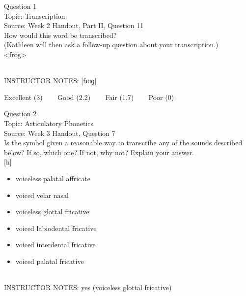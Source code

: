 \documentclass[12pt]{article}
\begin{document}
\begin{center}
\textbf{{\color{blue}{\HUGE START OF EXAM\\}}}

\textbf{{\color{blue}{\HUGE Student ID: 71052\\}}}

\textbf{{\color{blue}{\HUGE \\}}}

\end{center}
\newpage

{\large Question 1}\\

Topic: Transcription\\
Source: Week 2 Handout, Part II, Question 11\\

How would this word be transcribed?\\ (Kathleen will then ask a follow-up question about your transcription.)\\

<frog>


~\\
INSTRUCTOR NOTES: [fɹɑɡ]


\vfill
Excellent (3) ~~~ Good (2.2) ~~~ Fair (1.7) ~~~ Poor (0)
\newpage

{\large Question 2}\\

Topic: Articulatory Phonetics\\
Source: Week 3 Handout, Question 7\\

Is the symbol given a reasonable way to transcribe any of the sounds described below? If so, which one? If not, why not? Explain your answer.\\

{[h]}

\begin{itemize} \item voiceless palatal affricate \item voiced velar nasal \item voiceless glottal fricative \item voiced labiodental fricative \item voiced interdental fricative \item voiced palatal fricative \end{itemize}


~\\
INSTRUCTOR NOTES: yes (voiceless glottal fricative)
\end{document}
